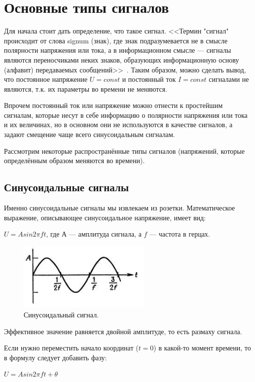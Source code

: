\section{Основные типы сигналов}
Для начала стоит дать определение, что такое сигнал. <<Термин "сигнал" происходит от слова signum (знак), где знак подразумевается не в смысле полярности напряжения или тока, а в информационном смысле — сигналы являются переносчиками неких знаков, образующих информационную основу (алфавит) передаваемых сообщений>>~\cite{dgs}. Таким образом, можно сделать вывод, что постоянное напряжение $U=const$ и постоянный ток $I=const$ сигналами не являются, т.к. их параметры во времени не меняются.

Впрочем постоянный ток или напряжение можно отнести к простейшим сигналам, которые несут в себе информацию о полярности напряжения или тока и их величинах, но в основном они не используются в качестве сигналов, а задают смещение чаще всего синусоидальным сигналам.

Рассмотрим некоторые распространённые типы сигналов (напряжений, которые определённым образом меняются во времени).
\subsection*{Синусоидальные сигналы}
Именно синусоидальные сигналы мы извлекаем из розетки. Математическое выражение, описывающее синусоидальное напряжение, имеет вид:

$U=A sin2 \pi ft$, где $А$ --- амплитуда сигнала, а $f$ --- частота в герцах.

	\begin{figure}[H]
    \centering
    \includegraphics[width=0.575\textwidth]{../image/s_sin.png}
    \caption{Синусоидальный сигнал.}
	\end{figure}
Эффективное значение равняется двойной амплитуде, то есть размаху сигнала. 

Если нужно переместить начало координат ($t=0$) в какой-то момент времени, то в формулу следует добавить фазу:

$U=A sin2 \pi ft + \theta$

